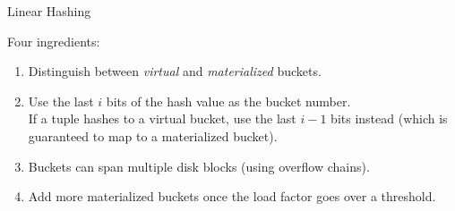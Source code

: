 %
% 
%

%
%
\begin{frame}{Linear Hashing}

Four ingredients:

\begin{enumerate}[label=(\arabic*)]

\item Distinguish between \emph{virtual} and \emph{materialized} buckets.

\item Use the \alert{last $i$} bits of the hash value as the bucket number.\\[0.5em] If a tuple hashes to a virtual bucket, use the last $i-1$ bits instead (which is guaranteed to map to a materialized bucket).

\item Buckets can span multiple disk blocks (using overflow chains).

\item Add more materialized buckets once the load factor goes over a threshold.
\end{enumerate}
\end{frame}

